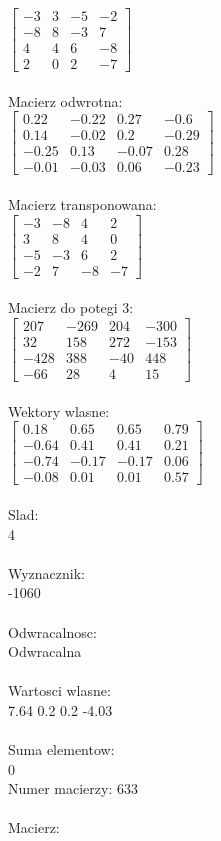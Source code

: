 \documentclass[a4paper,12pt]{article}
\begin{document}
$\begin{bmatrix} -3&3&-5&-2\\-8&8&-3&7\\4&4&6&-8\\2&0&2&-7 \end{bmatrix}$
\\
\\
Macierz odwrotna:\\

$\begin{bmatrix} 0.22&-0.22&0.27&-0.6\\0.14&-0.02&0.2&-0.29\\-0.25&0.13&-0.07&0.28\\-0.01&-0.03&0.06&-0.23 \end{bmatrix}$
\\
\\
Macierz transponowana:\\

$\begin{bmatrix} -3&-8&4&2\\3&8&4&0\\-5&-3&6&2\\-2&7&-8&-7 \end{bmatrix}$
\\
\\
Macierz do potegi 3:\\

$\begin{bmatrix} 207&-269&204&-300\\32&158&272&-153\\-428&388&-40&448\\-66&28&4&15 \end{bmatrix}$
\\
\\
Wektory wlasne:\\

$\begin{bmatrix} 0.18&0.65&0.65&0.79\\-0.64&0.41&0.41&0.21\\-0.74&-0.17&-0.17&0.06\\-0.08&0.01&0.01&0.57 \end{bmatrix}$
\\
\\
Slad:\\
4
\\
\\
Wyznacznik:\\
-1060
\\
\\
Odwracalnosc:\\
Odwracalna
\\
\\
Wartosci wlasne:\\
7.64 0.2 0.2 -4.03
\\
\\
Suma elementow:\\
0
\\
\newpage
Numer macierzy:
633
\\
\\
Macierz:\\
\end{document}
